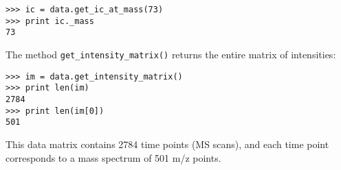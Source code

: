\begin{verbatim}
>>> ic = data.get_ic_at_mass(73)
>>> print ic._mass
73
\end{verbatim}

The method {\tt get\_intensity\_matrix()} returns the entire matrix of
intensities:

\begin{verbatim}
>>> im = data.get_intensity_matrix()
>>> print len(im)
2784
>>> print len(im[0])
501
\end{verbatim}

This data matrix contains 2784 time points (MS scans), and each time point
corresponds to a mass spectrum of 501 m/z points.


